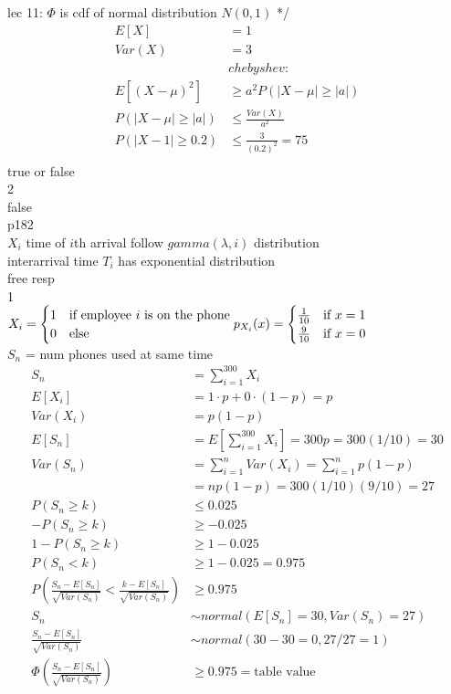 \documentclass[12pt,border=4pt,multi]{article} %
\begin{document}
lec 11: $\Phi$ is cdf of normal distribution $N(0, 1)$ */
\newpage
{}\\
\begin{align*}
E[X] &= 1\\
Var(X) &= 3\\
&chebyshev:\\
E[(X - \mu)^2] &\geq a^2 P(|X - \mu| \geq |a|)\\
P(|X - \mu| \geq |a|) &\leq \frac{Var(X)}{a^2}\\
P(|X - 1| \geq 0.2) &\leq \frac{3}{(0.2)^2} = 75\\
\end{align*}
\newpage
\noindent
true or false\\
2\\
false\\
p182\\
$X_i$ time of $i$th arrival follow $gamma(\lambda, i)$ distribution\\
interarrival time $T_i$ has exponential distribution\\
\newpage
\noindent
free resp\\
1\\
$X_i = \begin{cases}
1 & \text{if employee $i$ is on the phone}\\
0 & \text{else}\\
\end{cases}\\
p_{X_i}(x) = \begin{cases}
\frac{1}{10} & \text{if } x = 1\\ 
\frac{9}{10} & \text{if } x = 0\\
\end{cases}$\\
$S_n$ = num phones used at same time\\
\begin{align*}
S_n &= \sum_{i = 1}^{300} X_i\\
E[X_i] &= 1 \cdot p + 0 \cdot (1 - p) = p\\
Var(X_i) &= p(1 - p)\\
E[S_n] &= E\left[\sum_{i = 1}^{300} X_i\right] = 300p = 300(1/10) = 30\\
Var(S_n) &= \sum_{i = 1}^n Var(X_i) = \sum_{i = 1}^n p(1 - p)\\
&= np(1 - p) = 300(1/10)(9/10) = 27\\
P(S_n \geq k) &\leq 0.025\\
-P(S_n \geq k) &\geq -0.025\\
1 - P(S_n \geq k) &\geq 1 - 0.025\\
P(S_n < k) &\geq 1 - 0.025 = 0.975\\
P\left(\frac{S_n - E[S_n]}{\sqrt{Var(S_n)}} < \frac{k - E[S_n]}{\sqrt{Var(S_n)}}\right) &\geq 0.975\\
S_n &\sim normal(E[S_n] = 30, Var(S_n) = 27)\\
\frac{S_n - E[S_n]}{\sqrt{Var(S_n)}} &\sim normal(30 - 30 = 0, 27 / 27 = 1)\\
\Phi\left(\frac{S_n - E[S_n]}{\sqrt{Var(S_n)}}\right) &\geq 0.975 = \text{table value}\\
\end{align*}
\end{document}
